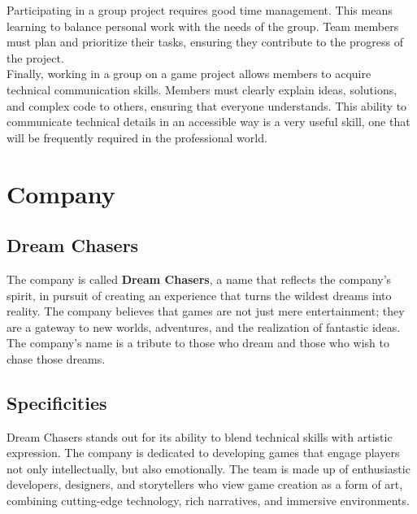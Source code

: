 \documentclass{article}
\begin{document}
Participating in a group project requires good time management. This means learning to balance personal work with the needs of the group. Team members must plan and prioritize their tasks, ensuring they contribute to the progress of the project.\\

Finally, working in a group on a game project allows members to acquire technical communication skills. Members must clearly explain ideas, solutions, and complex code to others, ensuring that everyone understands. This ability to communicate technical details in an accessible way is a very useful skill, one that will be frequently required in the professional world.















\newpage
\section{Company}
\subsection{Dream Chasers}\hfill

The company is called \textbf{Dream Chasers}, a name that reflects the company’s spirit, in pursuit of creating an experience that turns the wildest dreams into reality. The company believes that games are not just mere entertainment; they are a gateway to new worlds, adventures, and the realization of fantastic ideas. The company’s name is a tribute to those who dream and those who wish to chase those dreams.





\subsection{Specificities}\hfill

Dream Chasers stands out for its ability to blend technical skills with artistic expression. The company is dedicated to developing games that engage players not only intellectually, but also emotionally. The team is made up of enthusiastic developers, designers, and storytellers who view game creation as a form of art, combining cutting-edge technology, rich narratives, and immersive environments.\\
\end{document}
